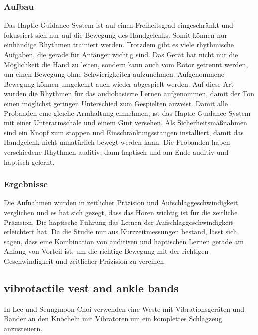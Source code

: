 \documentclass[ngerman,runningheads,a4paper]{llncs}
\begin{document}
\subsubsection{Aufbau}
Das Haptic Guidance System ist auf einen Freiheitsgrad eingeschränkt und fokussiert sich nur auf die Bewegung des Handgelenks.
Somit können nur einhändige Rhythmen trainiert werden.
Trotzdem gibt es viele rhythmische Aufgaben, die gerade für Anfänger wichtig sind.
Das Gerät hat nicht nur die Möglichkeit die Hand zu leiten, sondern kann auch vom Rotor getrennt werden, um einen Bewegung ohne Schwierigkeiten aufzunehmen.
Aufgenommene Bewegung können umgekehrt auch wieder abgespielt werden.
Auf diese Art wurden die Rhythmen für das audiobasierte Lernen aufgenommen, damit der Ton einen möglichst geringen Unterschied zum Gespielten auweist.
Damit alle Probanden eine gleiche Armhaltung einnehmen, ist das Haptic Guidance System mit einer Unterarmschale und einem Gurt versehen.
Als Sicherheitsmaßnahmen sind ein Knopf zum stoppen und Einschränkungsstangen installiert, damit das Handgelenk nicht unnatürlich bewegt werden kann.
Die Probanden haben verschiedene Rhythmen auditiv, dann haptisch und am Ende auditiv und haptisch gelernt.


\subsubsection{Ergebnisse}
Die Aufnahmen wurden in zeitlicher Präzision und Aufschlaggeschwindigkeit verglichen und es hat sich gezegt, dass das Hören wichtig ist für die zeitliche Präzision.
Die haptische Führung das Lernen der Aufschlaggeschwindigkeit erleichtert hat.
Da die Studie nur aus Kurzzeitmessungen bestand, lässt sich sagen, dass eine Kombination von auditiven und haptischen Lernen gerade am Anfang von Vorteil ist, um die richtige Bewegung mit der richtigen Geschwindigkeit und zeitlicher Präzision zu vereinen.



\subsection{vibrotactile vest and ankle bands}
In Lee und Seungmoon Choi \cite{6775447} verwenden eine Weste mit Vibrationsgeräten und Bänder an den Knöcheln mit Vibratoren um ein komplettes Schlagzeug anzusteuern.
\end{document}
